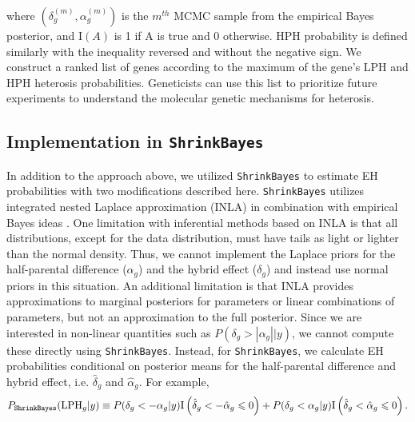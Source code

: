 \documentclass[useAMS,usenatbib,referee]{biom}
\newcommand{\ShrinkBayes}{{\tt ShrinkBayes}}
\begin{document}
where $\left(\delta_g^{(m)},\alpha_g^{(m)}\right)$ is the $m^{th}$ MCMC sample from the empirical Bayes posterior, and $\mathrm{I}(A)$ is 1 if A is true and 0 otherwise. HPH probability is defined similarly with the inequality reversed and without the negative sign. We construct a ranked list of genes according to the maximum of the gene's LPH and HPH heterosis probabilities. Geneticists can use this list to prioritize future experiments to understand the molecular genetic mechanisms for heterosis.  

\subsection{Implementation in \ShrinkBayes{}} \label{s:shrinkbayes}

In addition to the approach above, we utilized \ShrinkBayes{} to estimate EH probabilities with two modifications described here. \ShrinkBayes{} utilizes integrated nested Laplace approximation (INLA) \citep{rue2009approximate} in combination with empirical Bayes ideas \citep{van2014shrinkbayes}. One limitation with inferential methods based on INLA is that all distributions, except for the data distribution, must have tails as light or lighter than the normal density. Thus, we cannot implement the Laplace priors for the half-parental difference ($\alpha_g$) and the hybrid effect ($\delta_g$) and instead use normal priors in this situation. An additional limitation is that INLA provides approximations to marginal posteriors for parameters or linear combinations of parameters, but not an approximation to the full posterior. Since we are interested in non-linear quantities such as $P(\delta_g > |\alpha_g||y)$, we cannot compute these directly using \ShrinkBayes{}. Instead, for \ShrinkBayes{}, we calculate EH probabilities conditional on posterior means for the half-parental difference and hybrid effect, i.e. $\hat{\delta}_g$ and $\hat{\alpha}_g$. For example,  
\[ 
P_{\ShrinkBayes{}}(\mbox{LPH}_g|y) \equiv P(\delta_g<-\alpha_g|y)\mathrm{I}\left(\hat{\delta}_g < -\hat{\alpha}_g \le 0\right) + P(\delta_g<\alpha_g|y) \mathrm{I}\left(\hat{\delta}_g < \hat{\alpha}_g \le 0\right).
\]
\end{document}

